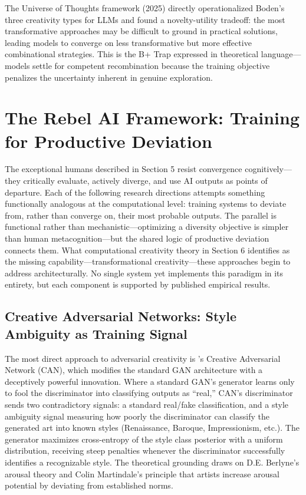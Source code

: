 \documentclass[12pt,a4paper]{article}
\begin{document}
The Universe of Thoughts framework (2025) directly operationalized Boden's three creativity types for LLMs and found a novelty-utility tradeoff: the most transformative approaches may be difficult to ground in practical solutions, leading models to converge on less transformative but more effective combinational strategies. This is the B+ Trap expressed in theoretical language---models settle for competent recombination because the training objective penalizes the uncertainty inherent in genuine exploration.

\section{The Rebel AI Framework: Training for Productive Deviation}
The exceptional humans described in Section 5 resist convergence cognitively---they critically evaluate, actively diverge, and use AI outputs as points of departure. Each of the following research directions attempts something functionally analogous at the computational level: training systems to deviate from, rather than converge on, their most probable outputs. The parallel is functional rather than mechanistic---optimizing a diversity objective is simpler than human metacognition---but the shared logic of productive deviation connects them. What computational creativity theory in Section 6 identifies as the missing capability---transformational creativity---these approaches begin to address architecturally. No single system yet implements this paradigm in its entirety, but each component is supported by published empirical results.

\subsection{Creative Adversarial Networks: Style Ambiguity as Training Signal}
The most direct approach to adversarial creativity is \citet{elgammal2017}'s Creative Adversarial Network (CAN), which modifies the standard GAN architecture with a deceptively powerful innovation. Where a standard GAN's generator learns only to fool the discriminator into classifying outputs as ``real,'' CAN's discriminator sends two contradictory signals: a standard real/fake classification, and a style ambiguity signal measuring how poorly the discriminator can classify the generated art into known styles (Renaissance, Baroque, Impressionism, etc.). The generator maximizes cross-entropy of the style class posterior with a uniform distribution, receiving steep penalties whenever the discriminator successfully identifies a recognizable style. The theoretical grounding draws on D.E. Berlyne's arousal theory and Colin Martindale's principle that artists increase arousal potential by deviating from established norms.
\end{document}
